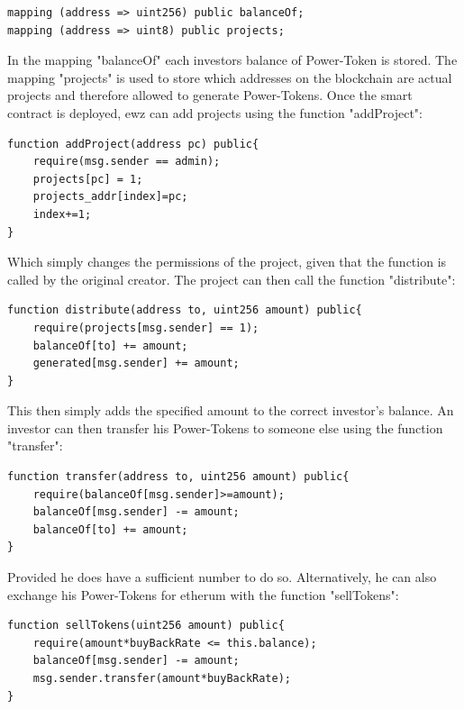 \begin{lstlisting}[language=Solidity, firstnumber=4]
mapping (address => uint256) public balanceOf;
mapping (address => uint8) public projects;
\end{lstlisting}

In the mapping "balanceOf" each investors balance of Power-Token is stored. The mapping "projects" is used to store which addresses on the blockchain are actual projects and therefore allowed to generate Power-Tokens.
Once the smart contract is deployed, ewz can add projects using the function "addProject":

\begin{lstlisting}[language=Solidity, firstnumber=38]
function addProject(address pc) public{
    require(msg.sender == admin);
    projects[pc] = 1;
    projects_addr[index]=pc;
    index+=1;
}
\end{lstlisting}

Which simply changes the permissions of the project, given that the function is called by the original creator. The project can then call the function "distribute":

\begin{lstlisting}[language=Solidity, firstnumber=43]
function distribute(address to, uint256 amount) public{
    require(projects[msg.sender] == 1);
    balanceOf[to] += amount;
    generated[msg.sender] += amount;
}
\end{lstlisting}

This then simply adds the specified amount to the correct investor's balance. An investor can then transfer his Power-Tokens to someone else using the function "transfer":

\begin{lstlisting}[language=Solidity, firstnumber=32]
function transfer(address to, uint256 amount) public{
    require(balanceOf[msg.sender]>=amount);
    balanceOf[msg.sender] -= amount;
    balanceOf[to] += amount;
}
\end{lstlisting}

Provided he does have a sufficient number to do so. Alternatively, he can also exchange his Power-Tokens for etherum with the function "sellTokens":

\begin{lstlisting}[language=Solidity, firstnumber=17]
function sellTokens(uint256 amount) public{
    require(amount*buyBackRate <= this.balance);
    balanceOf[msg.sender] -= amount;
    msg.sender.transfer(amount*buyBackRate);
}
\end{lstlisting}


